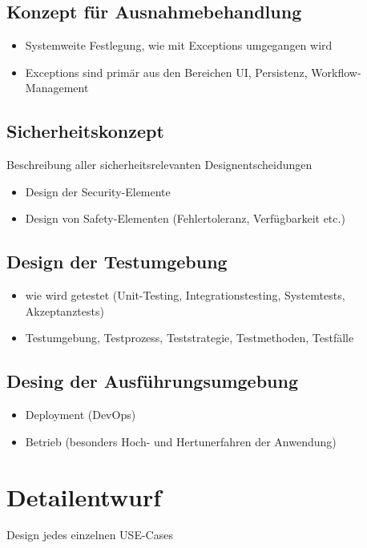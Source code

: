 \subsection{Konzept für Ausnahmebehandlung}
\begin{itemize}
	\item Systemweite Festlegung, wie mit Exceptions umgegangen wird
	\item Exceptions sind primär aus den Bereichen UI, Persistenz, Workflow-Management
\end{itemize}

\subsection{Sicherheitskonzept}
Beschreibung aller sicherheitsrelevanten Designentscheidungen

\begin{itemize}
	\item Design der Security-Elemente
	\item Design von Safety-Elementen (Fehlertoleranz, Verfügbarkeit etc.)
\end{itemize}

\subsection{Design der Testumgebung}
\begin{itemize}
	\item wie wird getestet (Unit-Testing, Integrationstesting, Systemtests, Akzeptanztests)
	\item Testumgebung, Testprozess, Teststrategie, Testmethoden, Testfälle
\end{itemize}


\subsection{Desing der Ausführungsumgebung}
\begin{itemize}
	\item Deployment (DevOps)
	\item Betrieb (besonders Hoch- und Hertunerfahren der Anwendung)
\end{itemize}

\section{Detailentwurf}

Design jedes einzelnen USE-Cases

